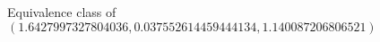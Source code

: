 \documentclass[preview]{standalone}
\begin{document}
\begin{center}
Equivalence class of $(1.6427997327804036, 0.037552614459444134, 1.140087206806521)$
\end{center}
\end{document}
